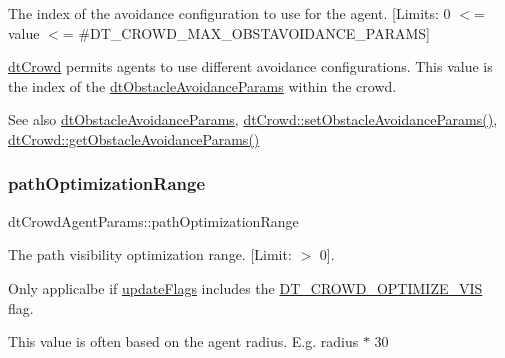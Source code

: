 The index of the avoidance configuration to use for the agent. \mbox{[}Limits\+: 0 $<$= value $<$= \#\+D\+T\+\_\+\+C\+R\+O\+W\+D\+\_\+\+M\+A\+X\+\_\+\+O\+B\+S\+T\+A\+V\+O\+I\+D\+A\+N\+C\+E\+\_\+\+P\+A\+R\+A\+MS\mbox{]}

\begin{DoxyParagraph}{}

\end{DoxyParagraph}
\hyperlink{classdtCrowd}{dt\+Crowd} permits agents to use different avoidance configurations. This value is the index of the \hyperlink{structdtObstacleAvoidanceParams}{dt\+Obstacle\+Avoidance\+Params} within the crowd.

\begin{DoxySeeAlso}{See also}
\hyperlink{structdtObstacleAvoidanceParams}{dt\+Obstacle\+Avoidance\+Params}, \hyperlink{classdtCrowd_a96338b9a99e8d58a3051a9ce7934e8b1}{dt\+Crowd\+::set\+Obstacle\+Avoidance\+Params()}, \hyperlink{classdtCrowd_a4da076dabe04b63d801c63c99d2fb5bb}{dt\+Crowd\+::get\+Obstacle\+Avoidance\+Params()} 
\end{DoxySeeAlso}
\mbox{\label{structdtCrowdAgentParams_ab390e7ccafffda667a1132917ad91b93}} 
\subsubsection{\texorpdfstring{path\+Optimization\+Range}{pathOptimizationRange}}
{\footnotesize\ttfamily dt\+Crowd\+Agent\+Params\+::path\+Optimization\+Range}



The path visibility optimization range. \mbox{[}Limit\+: $>$ 0\mbox{]}. 

\begin{DoxyParagraph}{}

\end{DoxyParagraph}
Only applicalbe if \hyperlink{structdtCrowdAgentParams_a7066a4477bbfa53fc1c983e17aa3e5ae}{update\+Flags} includes the \hyperlink{group__crowd_ggaa94b67d2fdcc390690c523f28019e52fad11f447facf1bf42c09de64e9483f3aa}{D\+T\+\_\+\+C\+R\+O\+W\+D\+\_\+\+O\+P\+T\+I\+M\+I\+Z\+E\+\_\+\+V\+IS} flag.

This value is often based on the agent radius. E.\+g. radius $\ast$ 30

